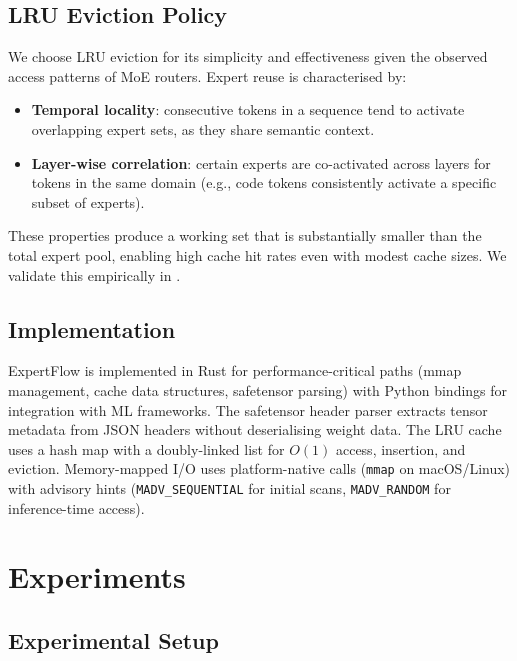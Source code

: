 \documentclass[11pt,a4paper]{article}
\begin{document}
\subsection{LRU Eviction Policy}
\label{sec:method:lru}

We choose LRU eviction for its simplicity and effectiveness given the observed
access patterns of MoE routers. Expert reuse is characterised by:
\begin{itemize}[nosep]
  \item \textbf{Temporal locality}: consecutive tokens in a sequence tend to
    activate overlapping expert sets, as they share semantic context.
  \item \textbf{Layer-wise correlation}: certain experts are co-activated
    across layers for tokens in the same domain (e.g., code tokens
    consistently activate a specific subset of experts).
\end{itemize}

These properties produce a working set that is substantially smaller than the
total expert pool, enabling high cache hit rates even with modest cache sizes.
We validate this empirically in .

\subsection{Implementation}
\label{sec:method:impl}

ExpertFlow is implemented in Rust for performance-critical paths (mmap
management, cache data structures, safetensor parsing) with Python bindings
for integration with ML frameworks. The safetensor header parser extracts
tensor metadata from JSON headers without deserialising weight data. The LRU
cache uses a hash map with a doubly-linked list for $O(1)$ access, insertion,
and eviction. Memory-mapped I/O uses platform-native calls (\texttt{mmap} on
macOS/Linux) with advisory hints (\texttt{MADV\_SEQUENTIAL} for initial scans,
\texttt{MADV\_RANDOM} for inference-time access).

\section{Experiments}
\label{sec:experiments}

\subsection{Experimental Setup}
\label{sec:experiments:setup}
\end{document}
